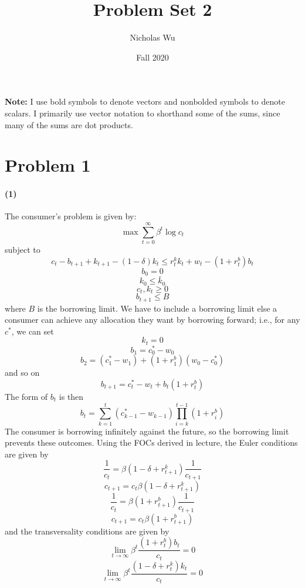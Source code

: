 \documentclass[10pt,letter]{article}
\newcommand{\problem}[1]{\section*{Problem #1}}
\newcommand{\problempart}[1]{\paragraph{#1}}
\begin{document}


\title{Problem Set 2}

\author{Nicholas Wu}

\date{Fall 2020}

\maketitle
\textbf{Note:} I use bold symbols to denote vectors and nonbolded symbols to denote scalars. I primarily use vector notation to shorthand some of the sums, since many of the sums are dot products.

\problem{1}

\problempart{(1)} The consumer's problem is given by:
\[ \max \sum_{t=0}^\infty \beta^t \log c_t\]
subject to
\[ c_t - b_{t+1} + k_{t+1} - (1-\delta) k_t \le r_t^k k_t + w_t - (1+r_t^b )b_t \]
\[ b_0 = 0 \]
\[ k_0 \le \bar{k}_0 \]
\[ c_t, k_t \ge 0 \]
\[ b_{t+1} \le B\]
where $B$ is the borrowing limit. We have to include a borrowing limit else a consumer can achieve any allocation they want by borrowing forward; i.e., for any $c^*$, we can set
\[ k_t = 0 \]
\[ b_1 =  c^*_0 - w_0 \]
\[ b_2 = ( c^*_1 - w_1) + (1+r_1^b)(w_0 - c^*_0)  \]
and so on
\[ b_{t+1} = c^*_t-w_t  + b_t(1 + r_t^b) \]
The form of $b_t$ is then
\[ b_t = \sum_{k=1}^{t} ( c^*_{k-1}-w_{k-1} ) \prod_{i={k}}^{t-1} (1+r_{i}^b) \]
The consumer is borrowing infinitely against the future, so the borrowing limit prevents these outcomes. Using the FOCs derived in lecture, the Euler conditions are given by
\[ \frac{1}{c_t} = \beta (1-\delta + r^k_{t+1})\frac{1}{c_{t+1}} \]
\[ c_{t+1} = c_t \beta (1-\delta + r^k_{t+1}) \]
\[ \frac{1}{c_t} = \beta (1 + r^b_{t+1})\frac{1}{c_{t+1}} \]
\[ c_{t+1} = c_t \beta (1 + r^b_{t+1}) \]
and the transversality conditions are given by
\[ \lim_{t \to \infty} \beta^t\frac{(1 + r^b_t) b_t}{c_t} = 0 \]
\[ \lim_{t \to \infty} \beta^t\frac{(1 - \delta + r^k_t) k_t}{c_t} = 0 \]
\end{document}
